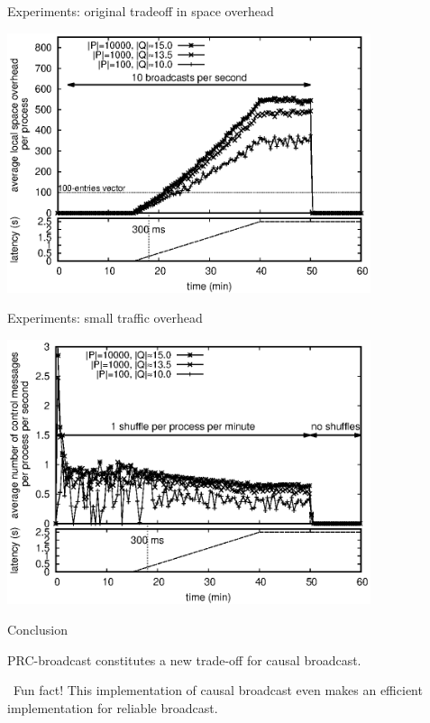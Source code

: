 \documentclass[10pt, xcolor={usenames, dvipsnames}]{beamer}
\begin{document}
\begin{frame}{Experiments: original tradeoff in space overhead}

  \begin{center}
    \includegraphics[width=0.8\textwidth]{img/overhead.eps}
  \end{center}

\end{frame}

\begin{frame}{Experiments: small traffic overhead}
  \begin{center}
    \includegraphics[width=0.8\textwidth]{img/controlmessages.eps}
  \end{center}
\end{frame}


\begin{frame}{Conclusion}
  
  PRC-broadcast constitutes a new trade-off for causal broadcast.

  \vspace{2em}

  \begin{table}
    \begin{center}
      
    \end{center}
  \end{table}

  \vspace{2em}

  \faLightbulbO~Fun fact! This implementation of causal broadcast even makes an
  efficient implementation for reliable broadcast.

\end{frame}
\end{document}
